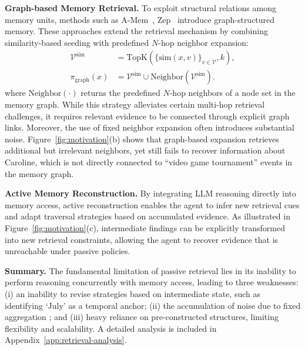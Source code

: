 \textbf{Graph-based Memory Retrieval.}
To exploit structural relations among memory units, methods such as A-Mem~\cite{DBLP:journals/corr/abs-2502-12110}, Zep~\cite{DBLP:journals/corr/abs-2501-13956} introduce graph-structured memory.
These approaches extend the retrieval mechanism by combining similarity-based seeding with predefined $N$-hop neighbor expansion:
\begin{equation}
\begin{aligned}
\mathcal{V}^{\text{sim}}
&=
\mathrm{TopK}\!\left(\{ \mathrm{sim}(x,v) \}_{v \in \mathcal{V}}, k \right), \\
\pi_{\text{graph}}(x)
&=
\mathcal{V}^{\text{sim}} \cup \mathrm{Neighbor}\!\left(\mathcal{V}^{\text{sim}}\right).
\end{aligned}
\end{equation}
where $\mathrm{Neighbor}(\cdot)$ returns the predefined $N$-hop neighbors of a node set in the memory graph.
While this strategy alleviates certain multi-hop retrieval challenges, it requires relevant evidence to be connected through explicit graph links.
Moreover, the use of fixed neighbor expansion often introduces substantial noise.
Figure~\ref{fig:motivation}(b) shows that graph-based expansion retrieves additional but irrelevant neighbors, yet still fails to recover information about Caroline, which is not directly connected to ``video game tournament'' events in the memory graph.

\textbf{Active Memory Reconstruction.}
By integrating LLM reasoning directly into memory access, active reconstruction enables the agent to infer new retrieval cues and adapt traversal strategies based on accumulated evidence.
As illustrated in Figure~\ref{fig:motivation}(c), intermediate findings can be explicitly transformed into new retrieval constraints, allowing the agent to recover evidence that is unreachable under passive policies.


\textbf{Summary.}
The fundamental limitation of passive retrieval lies in its inability to perform reasoning concurrently with memory access, leading to three  weaknesses: (i) an inability to revise strategies based on intermediate state, such as identifying `July' as a temporal anchor; (ii) the accumulation of noise due to fixed aggregation ; and (iii) heavy reliance on pre-constructed structures, limiting flexibility and scalability. A detailed analysis is included  in Appendix~\ref{app:retrieval-analysis}.

